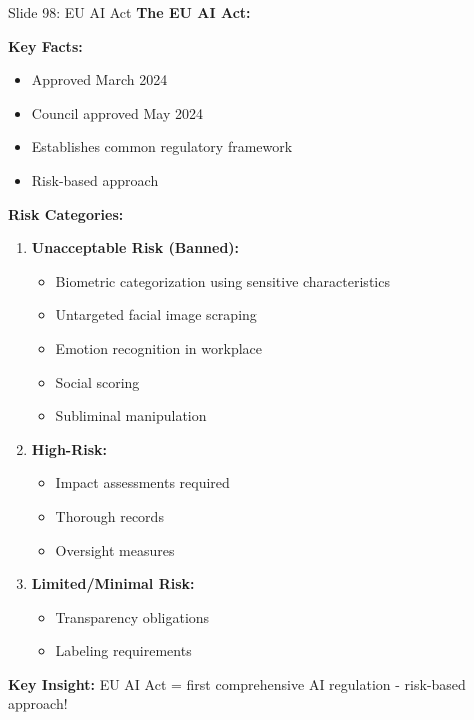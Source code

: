 \documentclass[8pt]{beamer}
\begin{document}
	\begin{frame}{Slide 98: EU AI Act}
		\fontsize{6.5}{7.5}\selectfont
		\textbf{The EU AI Act:}
		
		\vspace{0.1cm}
		\textbf{Key Facts:}
		\begin{itemize}
			\item Approved March 2024
			\item Council approved May 2024
			\item Establishes common regulatory framework
			\item Risk-based approach
		\end{itemize}
		
		\vspace{0.1cm}
		\textbf{Risk Categories:}
		\begin{enumerate}
			\item \textbf{Unacceptable Risk (Banned):}
			\begin{itemize}
				\item Biometric categorization using sensitive characteristics
				\item Untargeted facial image scraping
				\item Emotion recognition in workplace
				\item Social scoring
				\item Subliminal manipulation
			\end{itemize}
			\item \textbf{High-Risk:}
			\begin{itemize}
				\item Impact assessments required
				\item Thorough records
				\item Oversight measures
			\end{itemize}
			\item \textbf{Limited/Minimal Risk:}
			\begin{itemize}
				\item Transparency obligations
				\item Labeling requirements
			\end{itemize}
		\end{enumerate}
		
		\textcolor{myblue}{\textbf{Key Insight:}} EU AI Act = \textcolor{myblue}{first comprehensive AI regulation} - risk-based approach!
	\end{frame}
	
\end{document}
